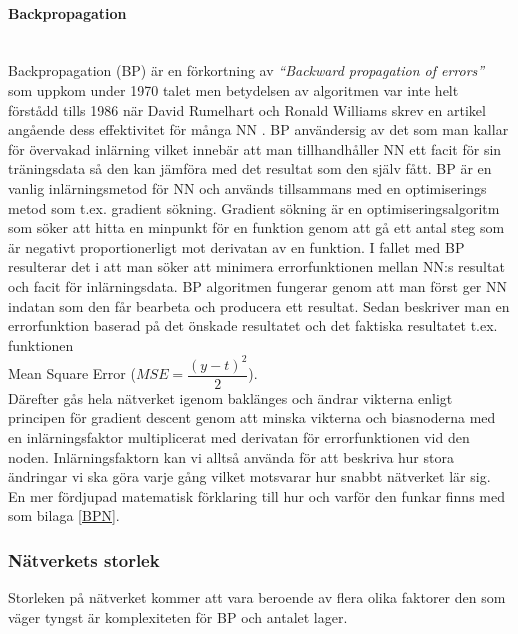 \documentclass[a4paper,10pt]{article}
\begin{document}
\paragraph{Backpropagation}\hspace{0pt}\\
Backpropagation (BP) är en förkortning av \emph{``Backward propagation of errors''} \autocite{BP} som uppkom under 1970 talet men betydelsen av algoritmen var inte helt förstådd tills 1986 när David Rumelhart och Ronald Williams skrev en artikel angående dess effektivitet för många NN \autocite{NNDL}. BP användersig av det som man kallar för övervakad inlärning vilket innebär att man tillhandhåller NN ett facit för sin träningsdata så den kan jämföra med det resultat som den själv fått. BP är en vanlig inlärningsmetod för NN och används tillsammans med en optimiserings metod som t.ex. gradient sökning. Gradient sökning är en optimiseringsalgoritm som söker att hitta en minpunkt för en funktion genom att gå ett antal steg som är negativt proportionerligt mot derivatan av en funktion\autocite{GD}. I fallet med BP resulterar det i att man söker att minimera errorfunktionen mellan NN:s resultat och facit för inlärningsdata.
BP algoritmen fungerar genom att man först ger NN indatan som den får bearbeta och producera ett resultat. Sedan beskriver man en errorfunktion baserad på det önskade resultatet och det faktiska resultatet t.ex. funktionen \\Mean Square Error ($MSE = \dfrac{(y-t)^2}{2}$). \\Därefter gås hela nätverket igenom baklänges och ändrar vikterna enligt principen för gradient descent genom att minska vikterna och biasnoderna med en inlärningsfaktor multiplicerat med derivatan för errorfunktionen vid den noden. Inlärningsfaktorn kan vi alltså använda för att beskriva hur stora ändringar vi ska göra varje gång vilket motsvarar hur snabbt nätverket lär sig. En mer fördjupad matematisk förklaring till hur och varför den funkar finns med som bilaga \ref{BPN}.

\subsubsection{Nätverkets storlek}
Storleken på nätverket kommer att vara beroende av flera olika faktorer den som väger tyngst är komplexiteten för BP och antalet lager.
\end{document}
